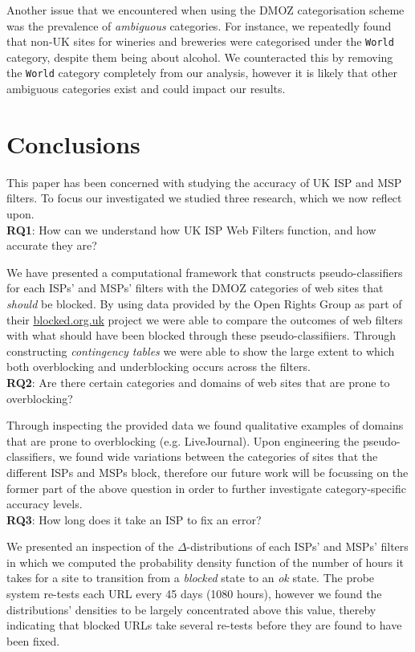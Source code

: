 \documentclass{bmcart}
\begin{document}
Another issue that we encountered when using the DMOZ categorisation scheme was the prevalence of \textit{ambiguous} categories. 
For instance, we repeatedly found that non-UK sites for wineries  and breweries were categorised under the \texttt{World} category, despite them being about alcohol.
We counteracted this by removing the \texttt{World} category completely from our analysis, however it is likely that other ambiguous categories exist and could impact our results.


\section*{Conclusions}
This paper has been concerned with studying the accuracy of UK ISP and MSP filters.
To focus our investigated we studied three research, which we now reflect upon.\\

\textbf{RQ1}: How can we understand how UK ISP Web Filters function, and how accurate they are?

We have presented a computational framework that constructs pseudo-classifiers for each ISPs' and MSPs' filters with the DMOZ categories of web sites that \textit{should} be blocked.
By using data provided by the Open Rights Group as part of their \url{blocked.org.uk} project we were able to compare the outcomes of web filters with what should have been blocked through these pseudo-classifiiers.
Through constructing \textit{contingency tables} we were able to show the large extent to which both overblocking and underblocking occurs across the filters.\\

\textbf{RQ2}: Are there certain categories and domains of web sites that are prone to overblocking?

Through inspecting the provided data we found qualitative examples of domains that are prone to overblocking (e.g. LiveJournal).
Upon engineering the pseudo-classifiers, we found wide variations between the categories of sites that the different ISPs and MSPs block, therefore our future work will be focussing on the former part of the above question in order to further investigate category-specific accuracy levels.\\

\textbf{RQ3}: How long does it take an ISP to fix an error?

We presented an inspection of the $\Delta$-distributions of each ISPs' and MSPs' filters in which we computed the probability density function of the number of hours it takes for a site to transition from a \textit{blocked} state to an \textit{ok} state.
The probe system re-tests each URL every 45 days (1080 hours), however we found the distributions' densities to be largely concentrated above this value, thereby indicating that blocked URLs take several re-tests before they are found to have been fixed.
\end{document}
